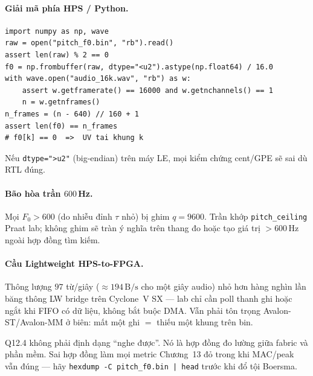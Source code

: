 \paragraph{Giải mã phía HPS / Python.}
\begin{verbatim}
import numpy as np, wave
raw = open("pitch_f0.bin", "rb").read()
assert len(raw) % 2 == 0
f0 = np.frombuffer(raw, dtype="<u2").astype(np.float64) / 16.0
with wave.open("audio_16k.wav", "rb") as w:
    assert w.getframerate() == 16000 and w.getnchannels() == 1
    n = w.getnframes()
n_frames = (n - 640) // 160 + 1
assert len(f0) == n_frames
# f0[k] == 0  =>  UV tai khung k
\end{verbatim}
Nếu \texttt{dtype=">u2"} (big-endian) trên máy LE, mọi kiểm chứng cent/GPE sẽ sai dù RTL đúng.

\paragraph{Bão hòa trần $600$\,Hz.} Mọi $F_0>600$ (do nhiễu đỉnh $\tau$ nhỏ) bị ghim $q=9600$. Trần khớp \texttt{pitch\_ceiling} Praat lab; không ghim sẽ tràn ý nghĩa trên thang đo hoặc tạo giá trị $>600\,\text{Hz}$ ngoài hợp đồng tìm kiếm.

\paragraph{Cầu Lightweight HPS-to-FPGA.} Thông lượng $97$ từ/giây ($\approx 194\,\text{B/s}$ cho một giây audio) nhỏ hơn hàng nghìn lần băng thông LW bridge trên Cyclone~V SX --- lab chỉ cần poll thanh ghi hoặc ngắt khi FIFO có dữ liệu, không bắt buộc DMA. Vẫn phải tôn trọng Avalon-ST/Avalon-MM ở biên: mất một ghi $=$ thiếu một khung trên bin.

\begin{physicalinsight}
Q12.4 không phải định dạng ``nghe được''. Nó là hợp đồng đo lường giữa fabric và phần mềm. Sai hợp đồng làm mọi metric Chương~13 đỏ trong khi MAC/peak vẫn đúng --- hãy \texttt{hexdump -C pitch\_f0.bin | head} trước khi đổ tội Boersma.
\end{physicalinsight}

